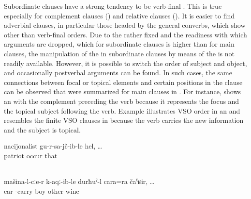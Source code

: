 Subordinate clauses have a strong tendency to be verb-final . This is true especially for complement clauses () and relative clauses (). It is easier to find adverbial clauses, in particular those headed by the general converbs, which show other than verb-final orders. Due to the rather fixed  and the readiness with which arguments are dropped, which for subordinate clauses is higher than for main clauses, the manipulation of the  in subordinate clauses by means of the  is not readily available. However, it is possible to switch the order of subject and object, and occasionally postverbal arguments can be found. In such cases, the same connections between focal or topical elements and certain positions in the clause can be observed that were summarized for main clauses in . For instance,  shows an  with the  complement preceding the verb because it represents the focus and the topical subject following the verb. Example  illustrates VSO order in an  and resembles the finite VSO clauses in  because the verb carries the new information and the subject is topical.
%
\begin{exe}
	\ex	\label{ex:‎‎‎That (journalist) was a nationalist}
	\gll	nacijonalist	gu-r-sa-jč-ib-le	hel, \ldots\\
		patriot	occur	that\\
	\glt	{}

	\\\label{ex:‎The boy brought another (bottle of) wine from the car}
	\gll	mašina-l-cːe-r	k-aqː-ib-le	durħuˁ-l	cara=ra	čaˁʁir, \ldots\\
		car	-carry	boy	other	wine\\
	\glt	{}
\end{exe}


